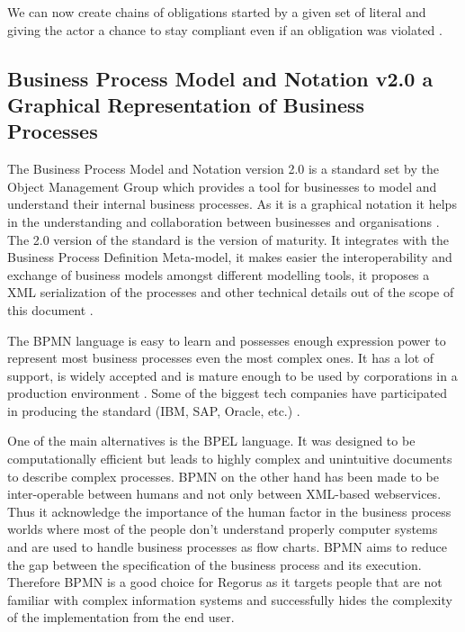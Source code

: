 \documentclass[10pt]{report}
\begin{document}
We can now create chains of obligations started by a given set of literal and giving the actor a chance to stay compliant even if an obligation was violated \autocite{NormComplianceinBPModeling}.

\subsection{Business Process Model and Notation v2.0 a Graphical Representation of Business Processes}

The Business Process Model and Notation version 2.0 is a standard set by the Object Management Group which provides a tool for businesses to model and understand their internal business processes. As it is a graphical notation it helps in the understanding and collaboration between businesses and organisations \autocite{BPMNWebsite}. The 2.0 version of the standard is the version of maturity. It integrates with the Business Process Definition Meta-model, it makes easier the interoperability and exchange of business models amongst different modelling tools, it proposes a XML serialization of the processes and other technical details out of the scope of this document \autocite{BPMNstandardDocument}.

The BPMN language is easy to learn and possesses enough expression power to represent most business processes even the most complex ones. It has a lot of support, is widely accepted and is mature enough to be used by corporations in a production environment \autocite{powerpointGagne2012}. Some of the biggest tech companies have participated in producing the standard (IBM, SAP, Oracle, etc.) \autocite{BPMNexample}.

One of the main alternatives is the BPEL language. It was designed to be computationally efficient but leads to highly complex and unintuitive documents to describe complex processes. BPMN on the other hand has been made to be inter-operable between humans and not only between XML-based webservices. Thus it acknowledge the importance of the human factor in the business process worlds where most of the people don't understand properly computer systems and are used to handle business processes as flow charts. BPMN aims to reduce the gap between the specification of the business process and its execution. Therefore BPMN is a good choice for Regorus as it targets people that are not familiar with complex information systems and successfully hides the complexity of the implementation from the end user. \autocite{BPMNstandardDocument}
\end{document}
